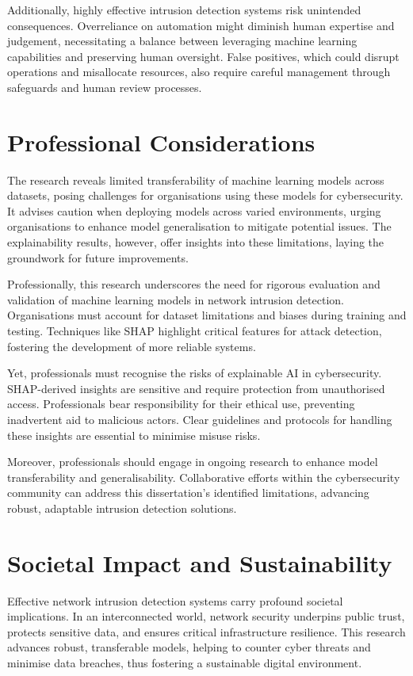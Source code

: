 Additionally, highly effective intrusion detection systems risk unintended consequences. Overreliance on automation might diminish human expertise and judgement, necessitating a balance between leveraging machine learning capabilities and preserving human oversight. False positives, which could disrupt operations and misallocate resources, also require careful management through safeguards and human review processes.

\section{Professional Considerations}
The research reveals limited transferability of machine learning models across datasets, posing challenges for organisations using these models for cybersecurity. It advises caution when deploying models across varied environments, urging organisations to enhance model generalisation to mitigate potential issues. The explainability results, however, offer insights into these limitations, laying the groundwork for future improvements.

Professionally, this research underscores the need for rigorous evaluation and validation of machine learning models in network intrusion detection. Organisations must account for dataset limitations and biases during training and testing. Techniques like SHAP highlight critical features for attack detection, fostering the development of more reliable systems.

Yet, professionals must recognise the risks of explainable AI in cybersecurity. SHAP-derived insights are sensitive and require protection from unauthorised access. Professionals bear responsibility for their ethical use, preventing inadvertent aid to malicious actors. Clear guidelines and protocols for handling these insights are essential to minimise misuse risks.

Moreover, professionals should engage in ongoing research to enhance model transferability and generalisability. Collaborative efforts within the cybersecurity community can address this dissertation’s identified limitations, advancing robust, adaptable intrusion detection solutions.

\section{Societal Impact and Sustainability}
Effective network intrusion detection systems carry profound societal implications. In an interconnected world, network security underpins public trust, protects sensitive data, and ensures critical infrastructure resilience. This research advances robust, transferable models, helping to counter cyber threats and minimise data breaches, thus fostering a sustainable digital environment.


